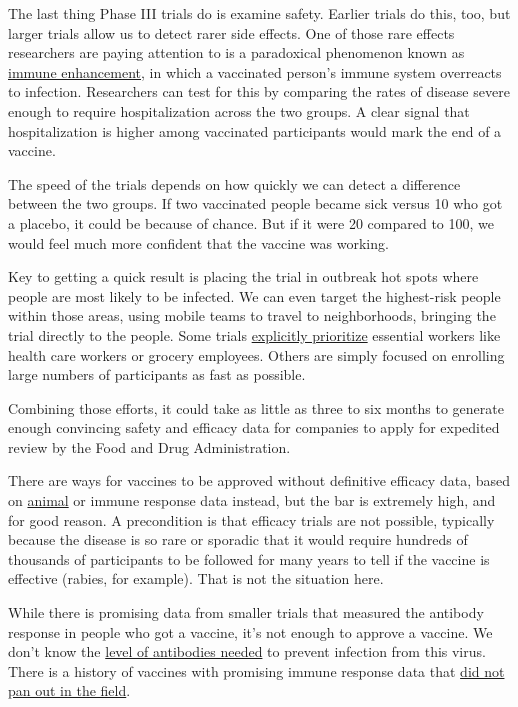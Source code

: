 The last thing Phase III trials do is examine safety. Earlier trials do
this, too, but larger trials allow us to detect rarer side effects. One
of those rare effects researchers are paying attention to is a
paradoxical phenomenon known as
\href{https://www.pnas.org/content/117/15/8218}{immune enhancement}, in
which a vaccinated person's immune system overreacts to infection.
Researchers can test for this by comparing the rates of disease severe
enough to require hospitalization across the two groups. A clear signal
that hospitalization is higher among vaccinated participants would mark
the end of a vaccine.

The speed of the trials depends on how quickly we can detect a
difference between the two groups. If two vaccinated people became sick
versus 10 who got a placebo, it could be because of chance. But if it
were 20 compared to 100, we would feel much more confident that the
vaccine was working.

Key to getting a quick result is placing the trial in outbreak hot spots
where people are most likely to be infected. We can even target the
highest-risk people within those areas, using mobile teams to travel to
neighborhoods, bringing the trial directly to the people. Some trials
\href{https://abc11.com/covdi-19-vaccine-clinical-trials-covid-19-volunteers-needed-wake-research/6337324/}{explicitly
prioritize} essential workers like health care workers or grocery
employees. Others are simply focused on enrolling large numbers of
participants as fast as possible.

Combining those efforts, it could take as little as three to six months
to generate enough convincing safety and efficacy data for companies to
apply for expedited review by the Food and Drug Administration.

There are ways for vaccines to be approved without definitive efficacy
data, based on
\href{https://www.nature.com/articles/npjvaccines201613}{animal} or
immune response data instead, but the bar is extremely high, and for
good reason. A precondition is that efficacy trials are not possible,
typically because the disease is so rare or sporadic that it would
require hundreds of thousands of participants to be followed for many
years to tell if the vaccine is effective (rabies, for example). That is
not the situation here.

While there is promising data from smaller trials that measured the
antibody response in people who got a vaccine, it's not enough to
approve a vaccine. We don't know the
\href{https://www.nature.com/articles/d41586-020-02174-y}{level of
antibodies needed} to prevent infection from this virus. There is a
history of vaccines with promising immune response data that
\href{https://www.fda.gov/media/102332/download}{did not pan out in the
field}.

